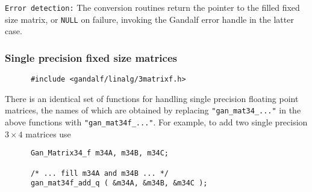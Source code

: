 {\tt Error detection:} The conversion routines return the pointer to the
filled fixed size matrix, or {\tt NULL} on failure, invoking the Gandalf
error handle in the latter case.

\subsubsection{Single precision fixed size matrices}
\begin{verbatim}
      #include <gandalf/linalg/3matrixf.h>
\end{verbatim}
There is an identical set of functions for handling single precision
floating point matrices, the names of which are obtained by replacing
{\tt "gan\_mat34\_..."} in the above functions with {\tt "gan\_mat34f\_..."}.
For example, to add two single precision $3\times 4$ matrices use
\begin{verbatim}
      Gan_Matrix34_f m34A, m34B, m34C;

      /* ... fill m34A and m34B ... */
      gan_mat34f_add_q ( &m34A, &m34B, &m34C );
\end{verbatim}
